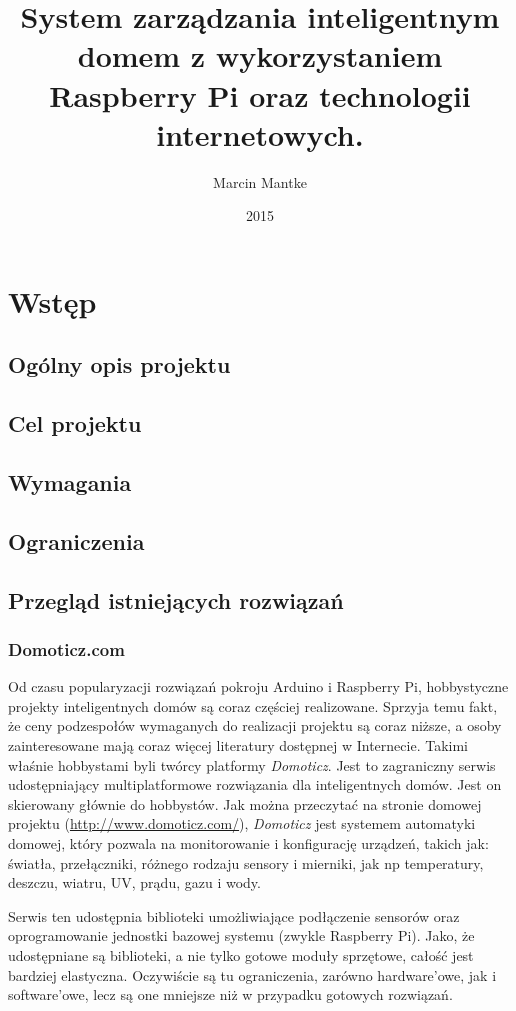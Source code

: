 \documentclass[eng,oneside]{mgr}
\author{Marcin Mantke}
\title{System zarządzania inteligentnym domem z wykorzystaniem Raspberry Pi oraz technologii internetowych.}
\date{2015}
\begin{document}
\maketitle
\tableofcontents
\chapter{Wstęp}
\section{Ogólny opis projektu}
\section{Cel projektu}
\section{Wymagania}
\section{Ograniczenia}



\section{Przegląd istniejących rozwiązań}
\subsection{Domoticz.com}
Od czasu popularyzacji rozwiązań pokroju Arduino i Raspberry Pi, hobbystyczne projekty inteligentnych domów są coraz częściej realizowane. Sprzyja temu fakt, że ceny podzespołów wymaganych do realizacji projektu są coraz niższe, a osoby zainteresowane mają coraz więcej literatury dostępnej w Internecie. Takimi właśnie hobbystami byli twórcy platformy \textit{Domoticz}. Jest to zagraniczny serwis udostępniający multiplatformowe rozwiązania dla inteligentnych domów. Jest on skierowany głównie do hobbystów. Jak można przeczytać na stronie domowej projektu (\url{http://www.domoticz.com/}), \textit{Domoticz} jest systemem automatyki domowej, który pozwala na monitorowanie i konfigurację urządzeń, takich jak: światła, przełączniki, różnego rodzaju sensory i mierniki, jak np temperatury, deszczu, wiatru, UV, prądu, gazu i wody.

Serwis ten udostępnia biblioteki umożliwiające podłączenie sensorów oraz oprogramowanie jednostki bazowej systemu (zwykle Raspberry Pi). Jako, że udostępniane są biblioteki, a nie tylko gotowe moduły sprzętowe, całość jest bardziej elastyczna. Oczywiście są tu ograniczenia, zarówno hardware'owe, jak i software'owe, lecz są one mniejsze niż w przypadku gotowych rozwiązań.
\end{document}
